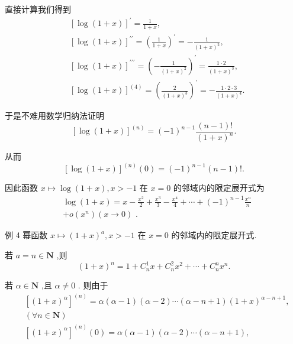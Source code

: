 直接计算我们得到
\begin{align*}
	&{\left\lbrack  \log \left( 1 + x\right) \right\rbrack  }^{\prime } = \frac{1}{1 + x},\\
	&{\left\lbrack  \log \left( 1 + x\right) \right\rbrack  }^{\prime \prime } = {\left( \frac{1}{1 + x}\right) }^{\prime } =  - \frac{1}{{\left( 1 + x\right) }^{2}},\\
	&{\left\lbrack  \log \left( 1 + x\right) \right\rbrack  }^{\prime \prime \prime } = {\left( -\frac{1}{{\left( 1 + x\right) }^{2}}\right) }^{\prime } = \frac{1 \cdot  2}{{\left( 1 + x\right) }^{3}},\\
	&{\left\lbrack  \log \left( 1 + x\right) \right\rbrack  }^{\left( 4\right) } = {\left( \frac{2}{{\left( 1 + x\right) }^{3}}\right) }^{\prime } =  - \frac{1 \cdot  2 \cdot  3}{{\left( 1 + x\right) }^{4}}.
\end{align*}

于是不难用数学归纳法证明
$${\left\lbrack  \log \left( 1 + x\right) \right\rbrack  }^{\left( n\right) } = {\left( -1\right) }^{n - 1}\frac{\left( {n - 1}\right) !}{{\left( 1 + x\right) }^{n}}.$$

从而
$${\left\lbrack  \log \left( 1 + x\right) \right\rbrack  }^{\left( n\right) }\left( 0\right)  = {\left( -1\right) }^{n - 1}\left( {n - 1}\right) !.$$

因此函数 $x \mapsto  \log \left( {1 + x}\right) ,x >  - 1$ 在 $x = 0$ 的邻域内的限定展开式为
\begin{align*}
	&\log \left( {1 + x}\right)  = x - \frac{{x}^{2}}{2} + \frac{{x}^{3}}{3} - \frac{{x}^{4}}{4} + \cdots  + {\left( -1\right) }^{n - 1}\frac{{x}^{n}}{n}\\
	&+ o\left( {x}^{n}\right) \left( {x \rightarrow  0}\right) \text{ . }
\end{align*}

例 4 幂函数 $x \mapsto  {\left( 1 + x\right) }^{a},x >  - 1$ 在 $x = 0$ 的邻域内的限定展开式.

若 $a = n \in  \mathbf{N}$ ,则
$${\left( 1 + x\right) }^{n} = 1 + {C}_{n}^{1}x + {C}_{n}^{2}{x}^{2} + \cdots  + {C}_{n}^{n}{x}^{n}.$$

若 $\alpha  \in  \mathbf{N}$ ,且 $\alpha  \neq  0$ . 则由于
\begin{align*}
	&{\left\lbrack  {\left( 1 + x\right) }^{\alpha }\right\rbrack  }^{\left( n\right) } = \alpha \left( {\alpha  - 1}\right) \left( {\alpha  - 2}\right) \cdots \left( {\alpha  - n + 1}\right) {\left( 1 + x\right) }^{\alpha  - n + 1},\\
	&\left( {\forall n \in  \mathbf{N}}\right)\\
	&{\left\lbrack  {\left( 1 + x\right) }^{\alpha }\right\rbrack  }^{\left( n\right) }\left( 0\right)  = \alpha \left( {\alpha  - 1}\right) \left( {\alpha  - 2}\right) \cdots \left( {\alpha  - n + 1}\right) ,
\end{align*}

